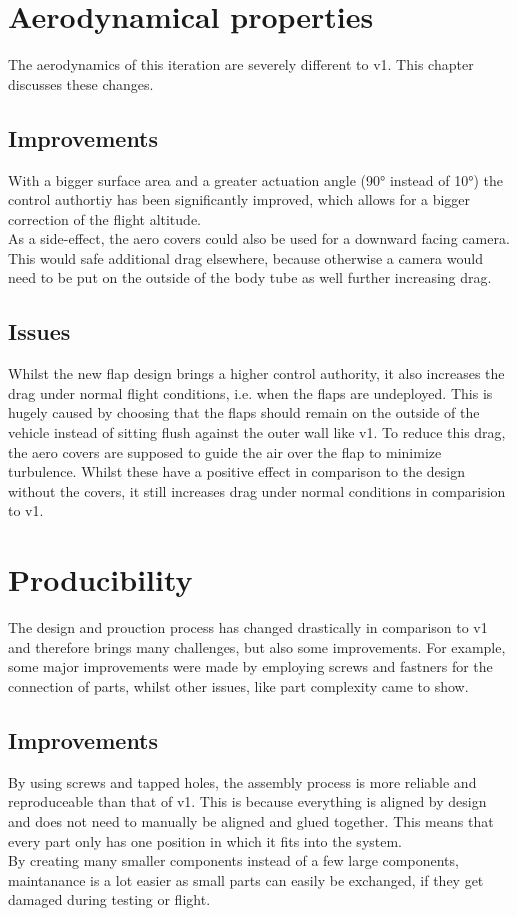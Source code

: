 \documentclass[fontsize=11pt,%
twoside,%
BCOR          = 8mm, %
DIV           = 11,  %
titlepage     = off,%
index=totoc,%
xcolor        = pdftex,%
dvipsnames,%
bibliography  = totoc,%
bibliography = numbered, %
listof        = notnumbered]{scrreprt}
\begin{document}
\section{Aerodynamical properties}
The aerodynamics of this iteration are severely different to v1. This chapter discusses these changes.

\subsection{Improvements}
With a bigger surface area and a greater actuation angle (90° instead of 10°) the control authortiy has been significantly improved, which allows for a bigger correction of the flight altitude.\\
As a side-effect, the aero covers could also be used for a downward facing camera. This would safe additional drag elsewhere, because otherwise a camera would need to be put on the outside of the body tube as well further increasing drag.

\subsection{Issues}
Whilst the new flap design brings a higher control authority, it also increases the drag under normal flight conditions, i.e. when the flaps are undeployed. This is hugely caused by choosing that the flaps should remain on the outside of the vehicle instead of sitting flush against the outer wall like v1. To reduce this drag, the aero covers are supposed to guide the air over the flap to minimize turbulence. Whilst these have a positive effect in comparison to the design without the covers, it still increases drag under normal conditions in comparision to v1.

\section{Producibility}
The design and prouction process has changed drastically in comparison to v1 and therefore brings many challenges, but also some improvements. For example, some major improvements were made by employing screws and fastners for the connection of parts, whilst other issues, like part complexity came to show.

\subsection{Improvements}
By using screws and tapped holes, the assembly process is more reliable and reproduceable than that of v1. This is because everything is aligned by design and does not need to manually be aligned and glued together. This means that every part only has one position in which it fits into the system.\\
By creating many smaller components instead of a few large components, maintanance is a lot easier as small parts can easily be exchanged, if they get damaged during testing or flight.\\
\end{document}
